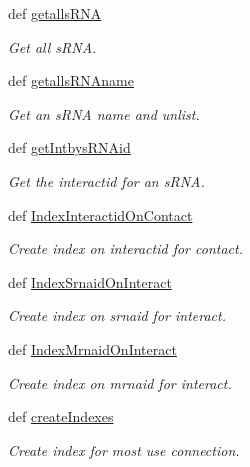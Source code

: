 \begin{DoxyCompactItemize}
def \hyperlink{classirna_1_1iRNA__stat_1_1Sqlite__manager_1_1Sqlite__manager_a425ccc2195db8203deec50271f59f0a5}{getalls\-R\-N\-A}
\begin{DoxyCompactList}\small\item\em \-Get all s\-R\-N\-A. \end{DoxyCompactList}\item 
def \hyperlink{classirna_1_1iRNA__stat_1_1Sqlite__manager_1_1Sqlite__manager_a22fdd216e2354cf5a52bcb60091dd3fa}{getalls\-R\-N\-Aname}
\begin{DoxyCompactList}\small\item\em \-Get an s\-R\-N\-A name and unlist. \end{DoxyCompactList}\item 
def \hyperlink{classirna_1_1iRNA__stat_1_1Sqlite__manager_1_1Sqlite__manager_aa6e0813887dfe006f8e3e0b7caa18904}{get\-Intbys\-R\-N\-Aid}
\begin{DoxyCompactList}\small\item\em \-Get the interactid for an s\-R\-N\-A. \end{DoxyCompactList}\item 
def \hyperlink{classirna_1_1iRNA__stat_1_1Sqlite__manager_1_1Sqlite__manager_a9b4bcd74626af828ab29b2fe1046532c}{\-Index\-Interactid\-On\-Contact}
\begin{DoxyCompactList}\small\item\em \-Create index on interactid for contact. \end{DoxyCompactList}\item 
def \hyperlink{classirna_1_1iRNA__stat_1_1Sqlite__manager_1_1Sqlite__manager_a7eaeb59fb6fd0237c688d0fe33284720}{\-Index\-Srnaid\-On\-Interact}
\begin{DoxyCompactList}\small\item\em \-Create index on srnaid for interact. \end{DoxyCompactList}\item 
def \hyperlink{classirna_1_1iRNA__stat_1_1Sqlite__manager_1_1Sqlite__manager_ac46e90f44346f290cb6e12e9c24a9682}{\-Index\-Mrnaid\-On\-Interact}
\begin{DoxyCompactList}\small\item\em \-Create index on mrnaid for interact. \end{DoxyCompactList}\item 
def \hyperlink{classirna_1_1iRNA__stat_1_1Sqlite__manager_1_1Sqlite__manager_a95935dbc86cd27805615d28e56a8b755}{create\-Indexes}
\begin{DoxyCompactList}\small\item\em \-Create index for most use connection. \end{DoxyCompactList}\end{DoxyCompactItemize}
